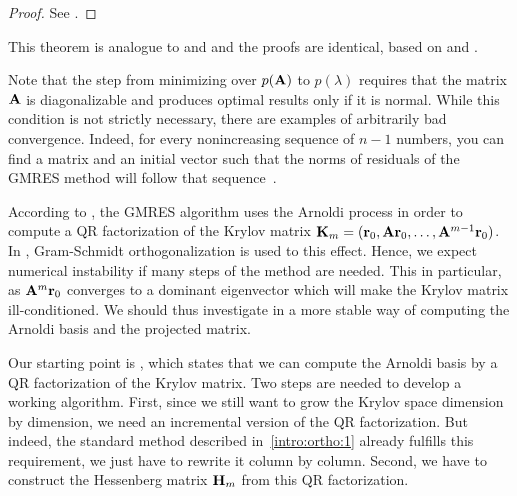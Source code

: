 \begin{proof}
  See \cite[Corollary 6.33]{Saad00}.
\end{proof}

\begin{remark}
  This theorem is analogue to  and
   and the proofs are
  identical, based on  and
  .

  Note that the step from minimizing over $p(\mathbf A)$ to $p(\lambda)$
  requires that the matrix $\mathbf A$ is diagonalizable and produces
  optimal results only if it is normal. While this condition is not
  strictly necessary, there are examples of arbitrarily bad
  convergence. Indeed, for every nonincreasing sequence of $n-1$
  numbers, you can find a matrix and an initial vector such that the
  norms of residuals of the GMRES method will follow that
  sequence~\cite{GreenbaumPtakStrakos96}.
\end{remark}

\begin{intro}
  According to , the GMRES
  algorithm uses the Arnoldi process in order to compute a QR
  factorization of the Krylov matrix
  $\mathbf K_m = (\mathbf r_0,\mathbf A\mathbf r_0,\dots,\mathbf A^{m-1}\mathbf r_0)$. In
  , Gram-Schmidt orthogonalization is
  used to this effect. Hence, we expect numerical instability if many
  steps of the method are needed. This in particular, as
  $\mathbf A^m\mathbf r_0$ converges to a dominant eigenvector which will make
  the Krylov matrix ill-conditioned. We should thus investigate in a
  more stable way of computing the Arnoldi basis and the projected
  matrix.

  Our starting point is , which
  states that we can compute the Arnoldi basis by a QR factorization
  of the Krylov matrix. Two steps are needed to develop a working
  algorithm. First, since we still want to grow the Krylov space
  dimension by dimension, we need an incremental version of the QR
  factorization. But indeed, the standard method described
  in~\ref{intro:ortho:1} already fulfills this requirement, we just
  have to rewrite it column by column. Second, we have to construct
  the Hessenberg matrix $\mathbf H_m$ from this QR factorization.
\end{intro}


